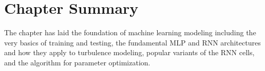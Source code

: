 \section{Chapter Summary}
The chapter has laid the foundation of machine learning modeling including the very basics of training and testing, the fundamental \ac{MLP} and \ac{RNN} architectures and how they apply to turbulence modeling, popular variants of the \ac{RNN} cells, and the algorithm for parameter optimization.
